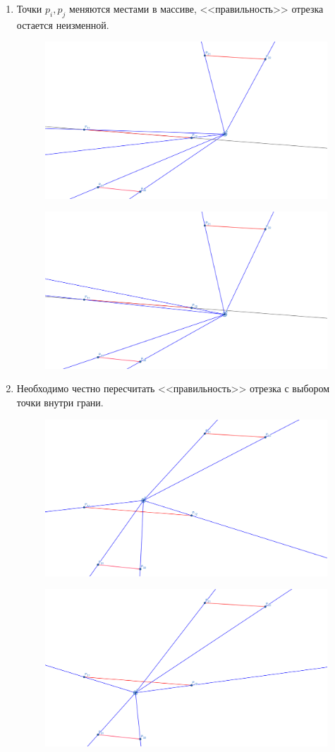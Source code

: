 \documentclass[letterpaper,12pt]{article}
\begin{document}
\begin{enumerate}
      \item Точки $p_i, p_j$ меняются местами в массиве, <<правильность>>
            отрезка остается неизменной.
            \begin{figure}[h]
            \centering
            \includegraphics[width=0.5\linewidth]{near_segment_1.png}
            \end{figure}
            \begin{figure}[h]
            \centering
            \includegraphics[width=0.5\linewidth]{near_segment_2.png}
            \end{figure}
      \item Необходимо честно пересчитать <<правильность>> отрезка
            с выбором точки внутри грани. %
            \begin{figure}[H]
            \centering
            \includegraphics[width=0.5\linewidth]{segment_1.png}
            \end{figure}
            \begin{figure}[H]
            \centering
            \includegraphics[width=0.5\linewidth]{segment_2.png}

\end{figure}
\end{enumerate}
\end{document}
